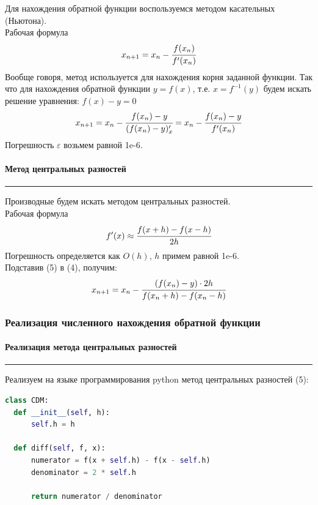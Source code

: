 \documentclass[a4paper, 14pt]{extarticle}
\begin{document}
Для нахождения обратной функции воспользуемся методом касательных (Ньютона). \\
Рабочая формула
\begin{equation*}
  x_{n+1} = x_n - \cfrac{f(x_n)}{f'(x_n)}
\end{equation*}
Вообще говоря, метод используется для нахождения корня заданной функции. Так что 
для нахождения обратной функции $y = f(x)$, т.е. $x = f^{-1}(y)$ будем искать 
решение уравнения: $f(x) - y = 0$
\begin{equation}
  x_{n+1} = x_n - \cfrac{f(x_n) - y}{(f(x_n) - y)'_x} = 
  x_n - \cfrac{f(x_n) - y}{f'(x_n)}
\end{equation}
Погрешность $\varepsilon$ возьмем равной 1e-6.

\paragraph{Метод центральных разностей}\vspace{-20pt}\rule{\linewidth}{0.1mm}

Производные будем искать методом центральных разностей.\\
Рабочая формула
\begin{equation}
  f'(x) \approx \cfrac{f(x+h) - f(x-h)}{2h}
\end{equation}
Погрешность определяется как $O(h)$, $h$ примем равной 1e-6.\\

Подставив (5) в (4), получим:
\begin{equation}
  x_{n+1} = x_n - \cfrac{(f(x_n) - y) \cdot 2 h}{f(x_n + h) - f(x_n - h)}
\end{equation}

\subsubsection{Реализация численного нахождения обратной функции}

\paragraph{Реализация метода центральных разностей}\vspace{-20pt}\rule{\linewidth}{0.1mm}

Реализуем на языке программирования python метод центральных разностей (5):

\begin{center}
  \begin{lstlisting}[language=Python, 
                   caption={Реализация метода центральных разностей}, 
                   label={lst:CDM}]
class CDM:
  def __init__(self, h):
      self.h = h
  
  def diff(self, f, x):
      numerator = f(x + self.h) - f(x - self.h)
      denominator = 2 * self.h

      return numerator / denominator
  \end{lstlisting}
\end{center}
\end{document}
